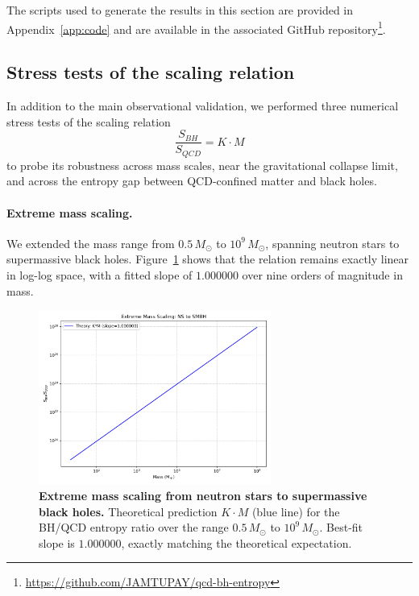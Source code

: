 \documentclass[aps,prd,onecolumn,nofootinbib,superscriptaddress]{revtex4-2}
\begin{document}
The scripts used to generate the results in this section are provided in Appendix~\ref{app:code} and are available in the associated GitHub repository\footnote{\url{https://github.com/JAMTUPAY/qcd-bh-entropy}}.

\subsection{Stress tests of the scaling relation}
\label{sec:stress_tests}

In addition to the main observational validation, we performed three numerical stress tests of the scaling relation
\[
\frac{S_{BH}}{S_{QCD}} = K \cdot M
\]
to probe its robustness across mass scales, near the gravitational collapse limit, and across the entropy gap between QCD-confined matter and black holes.

\paragraph{Extreme mass scaling.}
We extended the mass range from $0.5\,M_\odot$ to $10^9\,M_\odot$, spanning neutron stars to supermassive black holes. 
Figure~\ref{fig:extreme_scaling} shows that the relation remains exactly linear in log-log space, with a fitted slope of $1.000000$ over nine orders of magnitude in mass.

\begin{figure}[htbp]
\centering
\includegraphics[width=0.68\textwidth]{figures/extreme_mass_scaling.png}
\caption{\textbf{Extreme mass scaling from neutron stars to supermassive black holes.} 
Theoretical prediction $K \cdot M$ (blue line) for the BH/QCD entropy ratio over the range $0.5\,M_\odot$ to $10^9\,M_\odot$. 
Best-fit slope is $1.000000$, exactly matching the theoretical expectation.}
\label{fig:extreme_scaling}
\end{figure}
\end{document}
